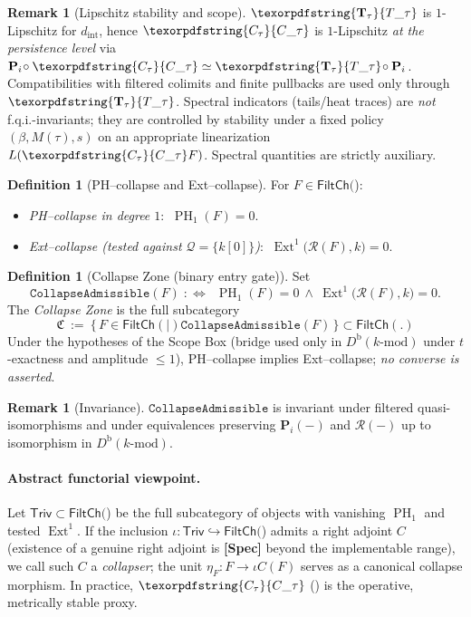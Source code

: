 \documentclass[11pt]{article}
\numberwithin{equation}{section}
\theoremstyle{plain}
\theoremstyle{definition}
\theoremstyle{remark}
\DeclareMathOperator{\Ext}{Ext}
\DeclareMathOperator{\PH}{PH}
\theoremstyle{plain}
\theoremstyle{definition}
\numberwithin{equation}{section}
\theoremstyle{definition}
\newtheorem{definition}[theorem]{Definition}
\newtheorem{remark}[theorem]{Remark}
\DeclareRobustCommand{\FiltCh}[1]{\mathsf{FiltCh}(#1)}
\DeclareRobustCommand{\Ttau}{\texorpdfstring{\ensuremath{\mathbf{T}_{\tau}}}{T\_\tau}}
\DeclareRobustCommand{\Ctau}{\texorpdfstring{\ensuremath{C_{\tau}}}{C\_\tau}}
\numberwithin{equation}{section}
\theoremstyle{plain}
\theoremstyle{definition}
\theoremstyle{remark}
\newcommand{\Dbk}{D^{\mathrm{b}}(k\text{-mod})}
\newcommand{\intdist}{d_{\mathrm{int}}}
\providecommand{\Cfun}[1]{\mathsf{C}_{#1}}
\providecommand{\Tfun}[1]{\mathbf{T}_{#1}}
\providecommand{\Ctau}{\Cfun{\tau}}
\providecommand{\Ttau}{\Tfun{\tau}}
\providecommand{\intdist}{d_{\mathrm{int}}}  %
\begin{document}
\begin{remark}[Lipschitz stability and scope]\label{rk:Ctau-stability}
\(\Ttau\) is \(1\)-Lipschitz for \(\intdist\), hence \(\Ctau\) is \(1\)-Lipschitz \emph{at the persistence level} via \(\mathbf{P}_i\!\circ \Ctau\simeq \Ttau\!\circ \mathbf{P}_i\). Compatibilities with filtered colimits and finite pullbacks are used only through \(\Ttau\). Spectral indicators (tails/heat traces) are \emph{not} f.q.i.-invariants; they are controlled by stability under a fixed policy \((\beta,M(\tau),s)\) on an appropriate linearization \(L(\Ctau F)\). Spectral quantities are strictly auxiliary.
\end{remark}

\begin{definition}[PH--collapse and Ext--collapse]
For \(F\in\FiltCh\):
\begin{itemize}[leftmargin=1.25em]
  \item \emph{PH--collapse in degree \(1\)}: \(\ \PH_1(F)=0\).
  \item \emph{Ext--collapse (tested against \(\mathcal{Q}=\{k[0]\}\))}: \(\ \Ext^1\!\big(\mathcal{R}(F),k\big)=0\).
\end{itemize}
\end{definition}

\begin{definition}[Collapse Zone (binary entry gate)]
Set
\[
\texttt{CollapseAdmissible}(F)\;:\!\!\iff\;\ \PH_1(F)=0\ \wedge\ \Ext^1\!\big(\mathcal{R}(F),k\big)=0.
\]
The \emph{Collapse Zone} is the full subcategory
\[
\mathfrak{C}\ :=\ \{\,F\in\FiltCh\mid \texttt{CollapseAdmissible}(F)\,\}\subset \FiltCh.
\]
Under the hypotheses of the Scope Box (bridge used only in \(\Dbk\) under \(t\)-exactness and amplitude \(\le 1\)), PH--collapse implies Ext--collapse; \emph{no converse is asserted}.
\end{definition}

\begin{remark}[Invariance]
\(\texttt{CollapseAdmissible}\) is invariant under filtered quasi-isomorphisms and under equivalences preserving \(\mathbf{P}_i(-)\) and \(\mathcal{R}(-)\) up to isomorphism in \(\Dbk\).
\end{remark}

\paragraph{Abstract functorial viewpoint.}
Let \(\mathsf{Triv}\subset\FiltCh\) be the full subcategory of objects with vanishing \(\PH_1\) and tested \(\Ext^1\). If the inclusion \(\iota:\mathsf{Triv}\hookrightarrow\FiltCh\) admits a right adjoint \(C\) (existence of a genuine right adjoint is \textbf{[Spec]} beyond the implementable range), we call such \(C\) a \emph{collapser}; the unit \(\eta_F:F\to \iota C(F)\) serves as a canonical collapse morphism. In practice, \(\Ctau\) () is the operative, metrically stable proxy.
\end{document}
